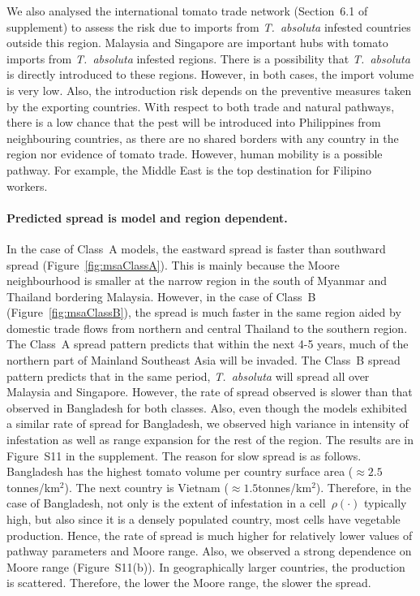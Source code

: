 \documentclass[11pt]{article}
\newcommand{\tuta}{\emph{T.~absoluta}}
\newcommand{\infest}{\rho}
\theoremstyle{definition}
\begin{document}
We also analysed the international tomato trade network
(Section~6.1 of supplement) to assess the risk due to
imports from \tuta{} infested countries outside this region.  Malaysia and
Singapore are important hubs with tomato imports from \tuta{} infested
regions. There is a possibility that \tuta{} is directly introduced to
these regions.  However, in both cases, the import volume is very low.
Also, the introduction risk depends on the preventive measures taken by the
exporting countries. With respect to both trade and natural pathways, there
is a low chance that the pest will be introduced into Philippines from
neighbouring countries, as there are no shared borders with any country in
the region nor evidence of tomato trade. However, human mobility is a
possible pathway. For example, the Middle East is the top destination for
Filipino workers.%
\paragraph{Predicted spread is model and region dependent.} In the case of
Class~A models, the eastward spread is faster than southward spread
(Figure~\ref{fig:msaClassA}). This is mainly because the Moore
neighbourhood is smaller at the narrow region in the south of Myanmar and
Thailand bordering Malaysia.  However, in the case of Class~B
(Figure~\ref{fig:msaClassB}), the spread is much faster in the same region
aided by domestic trade flows from northern and central Thailand to the
southern region. The Class~A spread pattern predicts that within the next
4-5 years, much of the northern part of Mainland Southeast Asia will be
invaded.  The Class~B spread pattern predicts that in the same period,
\tuta{} will spread all over Malaysia and Singapore.  However, the rate of
spread observed is slower than that observed in Bangladesh for both
classes. Also, even though the models exhibited a similar rate of spread
for Bangladesh, we observed high variance in intensity of infestation as
well as range expansion for the rest of the region. The results are in
Figure~S11 in the supplement. The reason for slow spread
is as follows.  Bangladesh has the highest tomato volume per country
surface area ($\approx2.5$tonnes/km$^2$).  The next country is Vietnam
($\approx1.5$tonnes/km$^2$). Therefore, in the case of Bangladesh, not only
is the extent of infestation in a cell~$\infest(\cdot)$ typically high, but
also since it is a densely populated country, most cells have vegetable
production. Hence, the rate of spread is much higher for relatively lower
values of pathway parameters and Moore range. Also, we observed a strong
dependence on Moore range (Figure~S11(b)).  In
geographically larger countries, the production is scattered. Therefore,
the lower the Moore range, the slower the spread.
\end{document}
